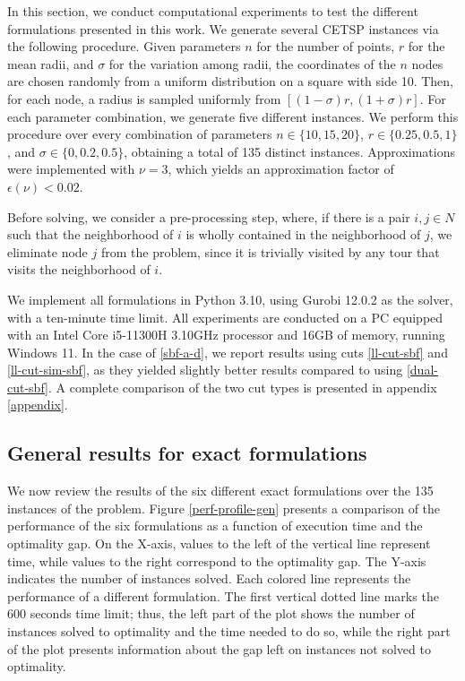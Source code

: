 \documentclass[pdflatex,sn-mathphys-num]{sn-jnl}%
\begin{document}
In this section, we conduct computational experiments to test the different formulations presented in this work. We generate several CETSP instances via the following procedure. Given parameters $n$ for the number of points, $r$ for the mean radii, and $\sigma$ for the variation among radii, the coordinates of the $n$ nodes are chosen randomly from a uniform distribution on a square with side 10. Then, for each node, a radius is sampled uniformly from $[(1-\sigma)r, (1+\sigma)r]$. For each parameter combination, we generate five different instances. We perform this procedure over every combination of parameters $n \in \{10, 15, 20\}$, $r \in \{0.25, 0.5, 1\}$, and $\sigma \in \{0, 0.2, 0.5\}$, obtaining a total of 135 distinct instances. Approximations were implemented with $\nu = 3$, which yields an approximation factor of $\epsilon(\nu) < 0.02$.

Before solving, we consider a pre-processing step, where, if there is a pair $i,j \in N$ such that the neighborhood of $i$ is wholly contained in the neighborhood of $j$, we eliminate node $j$ from the problem, since it is trivially visited by any tour that visits the neighborhood of $i$.

We implement all formulations in Python 3.10, using Gurobi 12.0.2 as the solver, with a ten-minute time limit. All experiments are conducted on a PC equipped with an Intel Core i5-11300H 3.10GHz processor and 16GB of memory, running Windows 11. In the case of \ref{sbf-a-d}, we report results using cuts \eqref{ll-cut-sbf} and \eqref{ll-cut-sim-sbf}, as they yielded slightly better results compared to using \eqref{dual-cut-sbf}. A complete comparison of the two cut types is presented in appendix \ref{appendix}.

\subsection{General results for exact formulations} \label{gen-res}

We now review the results of the six different exact formulations over the 135 instances of the problem. Figure \ref{perf-profile-gen} presents a comparison of the performance of the six formulations as a function of execution time and the optimality gap. On the X-axis, values to the left of the vertical line represent time, while values to the right correspond to the optimality gap. The Y-axis indicates the number of instances solved. Each colored line represents the performance of a different formulation. The first vertical dotted line marks the 600 seconds time limit; thus, the left part of the plot shows the number of instances solved to optimality and the time needed to do so, while the right part of the plot presents information about the gap left on instances not solved to optimality.
\end{document}
